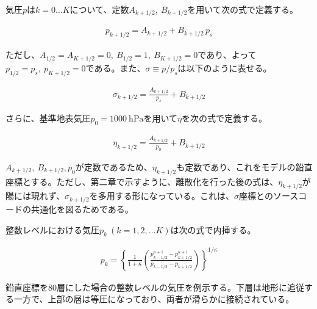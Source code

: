 気圧\(p\)は\(k = 0 \ldots K\)について、定数\(A_{k+1/2},\ B_{k+1/2}\)を用いて次の式で定義する。

\begin{eqnarray}
p_{k+1/2} = A_{k+1/2} +B_{k+1/2}\,p_s
\end{eqnarray}

ただし、\(A_{1/2}=A_{K+1/2}=0,\ B_{1/2}=1,\ B_{K+1/2}=0\)であり、よって\(p_{1/2}=p_s,\ p_{K+1/2}=0\)である。また、\(\sigma\equiv p/p_s\)は以下のように表せる。

\begin{eqnarray}
\sigma_{k+1/2} = \frac{A_{k+1/2}}{p_s} +B_{k+1/2}
\end{eqnarray}

さらに、基準地表気圧\(p_0=1000\ \mathrm{hPa}\)を用いて\(\eta\)を次の式で定義する。

\begin{eqnarray}
\eta_{k+1/2} = \frac{A_{k+1/2}}{p_0} +B_{k+1/2}
\end{eqnarray}

\(A_{k+1/2},\ B_{k+1/2}, p_0\)が定数であるため、\(\eta_{k+1/2}\)も定数であり、これをモデルの鉛直座標とする。ただし、第二章で示すように、離散化を行った後の式は、\(\eta_{k+1/2}\)が陽には現れず、\(\sigma_{k+1/2}\)を多用する形になっている。これは、\(\sigma\)座標とのソースコードの共通化を図るためである。

整数レベルにおける気圧\(p_k\ (k=1,2,\ldots K)\)は次の式で内挿する。

\begin{eqnarray}
 p_k = \left\{ \frac{1}{1+\kappa}
                     \left( \frac{  p^{\kappa +1}_{k-1/2}
                                  - p^{\kappa +1}_{k+1/2}      }
                                  { p_{k-1/2} - p_{k+1/2} }
                     \right)
              \right\}^{1/\kappa}
\end{eqnarray}

鉛直座標を80層にした場合の整数レベルの気圧を例示する。下層は地形に追従する一方で、上部の層は等圧になっており、両者が滑らかに接続されている。

